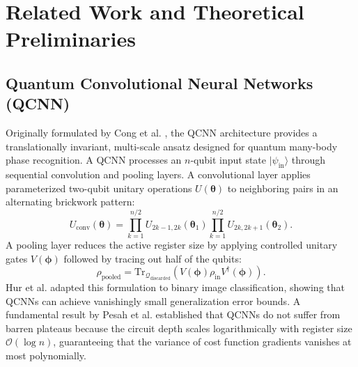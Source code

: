 \documentclass[10pt,twocolumn,twoside,a4paper]{article}
\newcommand{\ket}[1]{|#1\rangle}
\begin{document}
\section{Related Work and Theoretical Preliminaries}
\label{sec:related_work}

\subsection{Quantum Convolutional Neural Networks (QCNN)}
Originally formulated by Cong et al. \cite{cong2019quantum}, the QCNN architecture provides a translationally invariant, multi-scale ansatz designed for quantum many-body phase recognition. A QCNN processes an $n$-qubit input state $\ket{\psi_{\text{in}}}$ through sequential convolution and pooling layers. A convolutional layer applies parameterized two-qubit unitary operations $U(\boldsymbol{\theta})$ to neighboring pairs in an alternating brickwork pattern:
\begin{equation}
    U_{\text{conv}}(\boldsymbol{\theta}) = \prod_{k=1}^{n/2} U_{2k-1, 2k}(\boldsymbol{\theta}_1) \prod_{k=1}^{n/2} U_{2k, 2k+1}(\boldsymbol{\theta}_2).
\end{equation}
A pooling layer reduces the active register size by applying controlled unitary gates $V(\boldsymbol{\phi})$ followed by tracing out half of the qubits:
\begin{equation}
    \rho_{\text{pooled}} = \text{Tr}_{\mathcal{Q}_{\text{discarded}}} \left( V(\boldsymbol{\phi}) \rho_{\text{in}} V^\dagger(\boldsymbol{\phi}) \right).
\end{equation}
Hur et al. \cite{hur2022quantum} adapted this formulation to binary image classification, showing that QCNNs can achieve vanishingly small generalization error bounds. A fundamental result by Pesah et al. \cite{pesah2021absence} established that QCNNs do not suffer from barren plateaus because the circuit depth scales logarithmically with register size $\mathcal{O}(\log n)$, guaranteeing that the variance of cost function gradients vanishes at most polynomially.
\end{document}
